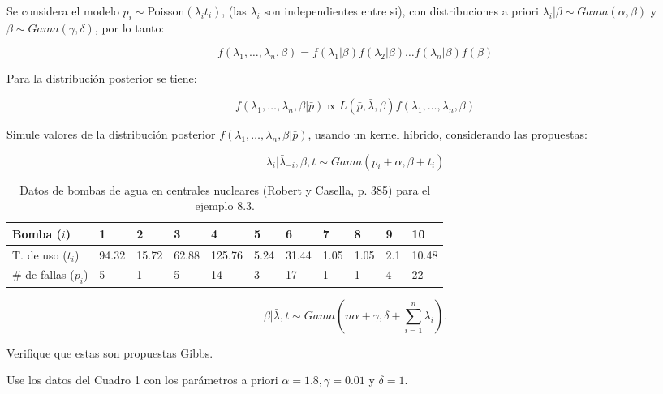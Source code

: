 \documentclass{article}
\begin{document}
\begin{enumerate}
    Se considera el modelo $p_i \sim $Poisson$(\lambda_i t_i)$, (las $\lambda_i$ 
    son independientes entre si), con distribuciones a priori $\lambda_i|\beta 
    \sim Gama(\alpha, \beta)$ y $\beta \sim Gama(\gamma, \delta)$, por lo tanto:
    
    \[f (\lambda_1, \dots , \lambda_n, \beta) = f (\lambda_1|\beta)f (\lambda_2|
    \beta) \dots f(\lambda_n|\beta)f(\beta)\]
    
    Para la distribución posterior se tiene:
    
    \[f (\lambda_1, \dots , \lambda_n, \beta|\bar p) \propto L(\bar p, \bar \lambda,
     \beta)f (\lambda_1, \dots , \lambda_n, \beta)\]
    
    Simule valores de la distribución posterior $f (\lambda_1, \dots , \lambda_n, 
    \beta|\bar p)$, usando un kernel híbrido, considerando las propuestas: 
    
    \[\lambda_i|\bar \lambda_{-i}, \beta, \bar t \sim Gama(p_i + \alpha , \beta + 
    t_i)\]

    \begin{table}[!h] \centering
        \begin{tabular}{|l|l|l|l|l|l|l|l|l|l|l|}
            \hline
            Bomba ($i$)         & 1     & 2     & 3     & 4      & 5    & 6     & 7    & 8    & 9   & 10    \\ \hline
            T. de uso ($t_i$)    & 94.32 & 15.72 & 62.88 & 125.76 & 5.24 & 31.44 & 1.05 & 1.05 & 2.1 & 10.48 \\ \hline
            \# de fallas ($p_i$) & 5     & 1     & 5     & 14     & 3    & 17    & 1    & 1    & 4   & 22    \\ \hline
        \end{tabular} 
        \label{tab1}
        \caption{Datos de bombas de agua en centrales nucleares (Robert y Casella,
        p. 385) para el ejemplo 8.3.}
    \end{table}



    \[\beta|\bar \lambda, \bar t \sim Gama \left( n\alpha + \gamma , \delta + 
    \sum_{i=1}^n\lambda_i \right).\]
    
    Verifique que estas son propuestas Gibbs.

    Use los datos del Cuadro 1 con los parámetros a priori $\alpha = 1.8, 
    \gamma = 0.01$ y $\delta = 1$.


   
\end{enumerate}




 
\end{document}
